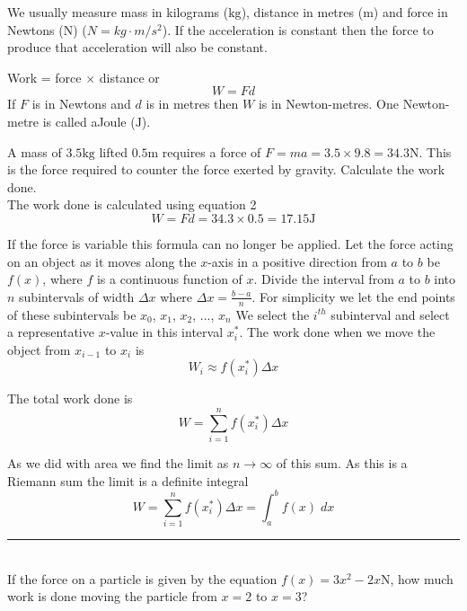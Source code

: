We usually measure mass in kilograms ($\mbox{kg}$), distance in metres ($\mbox{m}$) and force in Newtons ($\mbox{N}$) \linebreak\relax ($N =k g \cdot m/s^{2}$). If the acceleration is constant then the force to produce that acceleration will also
be constant. 

Work = force $ \times $ distance or
\begin{equation}W =F d\tag{2}
\end{equation}If $F$ is in Newtons and $d$ is in metres then $W$ is in Newton-metres. One Newton-metre is called a\linebreak\relax Joule
($\mbox{J}$). 

\example A mass of $3.5 \mbox{kg}$ lifted $0.5 \mbox{m}$ requires a force of $\displaystyle F =m a =3.5 \times 9.8 =34.3 \mbox{N}$. This is the force required to counter the force exerted by gravity. Calculate the work done.\\
\solution The work done is calculated using equation 2
\begin{equation*}W =F d =34.3 \times 0.5 =17.15 \mbox{J}
\end{equation*}

If the force is variable this formula can no longer be applied. Let
the force acting on an object as it moves along the $x$-axis in a positive direction from $a$ to $b$ be $f (x)$, where $f$ is a continuous function of $x$. Divide the interval from $a$ to $b$ into $n$ subintervals of width $ \Delta x$ where $ \Delta x =\frac{b -a}{n}$. For
simplicity we let the end points of these subintervals be $x_{0}$, $x_{1}$, $x_{2}$, ..., $x_{n}$ We select the $i^{t h}$ subinterval and select a representative $x$-value in this interval $x_{i}^{ \ast }$. The work done when we move the object from $x_{i -1}$ to $x_{i}$ is
\begin{equation*}W_{i} \approx f (x_{i}^{ \ast })  \Delta x
\end{equation*}

The total work done is
\begin{equation}W =\sum _{i =1}^{n}f (x_{i}^{ \ast })  \Delta x\tag{3}
\end{equation}

As we did with area we find the limit as $n \rightarrow \infty $ of this sum. As this is a Riemann sum the limit is a definite integral
\begin{equation}W =\sum _{i =1}^{n}f (x_{i}^{ \ast })  \Delta x =\int _{a}^{b}f (x)\; d x\tag{4}
\end{equation}
\rule{6.8cm}{0.5pt}\\
\example If the force on a particle is given by the equation $f (x) =3 x^{2} -2 x \mbox{N}$, how much work is done moving the particle from $x =2$ to $x =3$?

